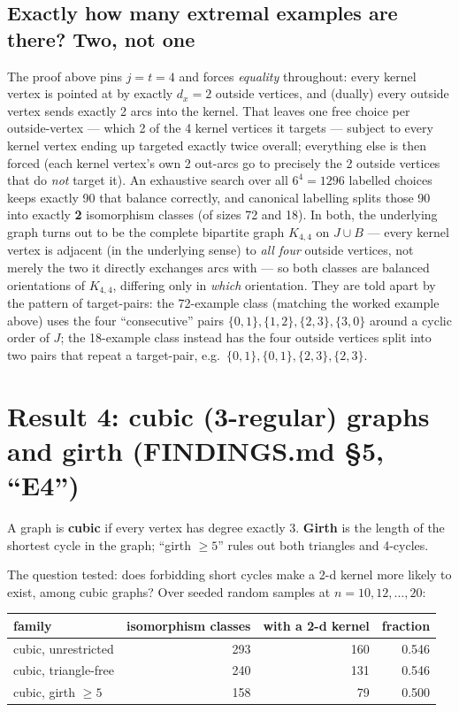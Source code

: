 \documentclass[11pt]{article}
\theoremstyle{plain}
\theoremstyle{definition}
\theoremstyle{remark}
\begin{document}
\subsection{Exactly how many extremal examples are there? Two, not one}

The proof above pins $j = t = 4$ and forces \emph{equality} throughout: every kernel
vertex is pointed at by exactly $d_x = 2$ outside vertices, and (dually) every outside
vertex sends exactly 2 arcs into the kernel. That leaves one free choice per
outside-vertex — which 2 of the 4 kernel vertices it targets — subject to every kernel
vertex ending up targeted exactly twice overall; everything else is then forced (each
kernel vertex's own 2 out-arcs go to precisely the 2 outside vertices that do
\emph{not} target it). An exhaustive search over all $6^4 = 1296$ labelled choices
keeps exactly 90 that balance correctly, and canonical labelling splits those 90 into
exactly \textbf{2} isomorphism classes (of sizes 72 and 18). In both, the underlying
graph turns out to be the complete bipartite graph $K_{4,4}$ on $J \cup B$ — every
kernel vertex is adjacent (in the underlying sense) to \emph{all four} outside
vertices, not merely the two it directly exchanges arcs with — so both classes are
balanced orientations of $K_{4,4}$, differing only in \emph{which} orientation. They
are told apart by the pattern of target-pairs: the 72-example class (matching the
worked example above) uses the four ``consecutive'' pairs $\{0,1\},\{1,2\},\{2,3\},
\{3,0\}$ around a cyclic order of $J$; the 18-example class instead has the four
outside vertices split into two pairs that repeat a target-pair, e.g.\
$\{0,1\},\{0,1\},\{2,3\},\{2,3\}$.

\section{Result 4: cubic (3-regular) graphs and girth (FINDINGS.md \S5, ``E4'')}

A graph is \textbf{cubic} if every vertex has degree exactly 3. \textbf{Girth} is the
length of the shortest cycle in the graph; ``girth $\ge 5$'' rules out both triangles
and 4-cycles.

The question tested: does forbidding short cycles make a 2-d kernel more likely to
exist, among cubic graphs? Over seeded random samples at $n = 10, 12, \dots, 20$:

\begin{center}
\begin{tabular}{@{}lrrr@{}}
\toprule
family & isomorphism classes & with a 2-d kernel & fraction \\
\midrule
cubic, unrestricted & 293 & 160 & 0.546 \\
cubic, triangle-free & 240 & 131 & 0.546 \\
cubic, girth $\ge 5$ & 158 & 79 & 0.500 \\
\bottomrule
\end{tabular}
\end{center}
\end{document}
